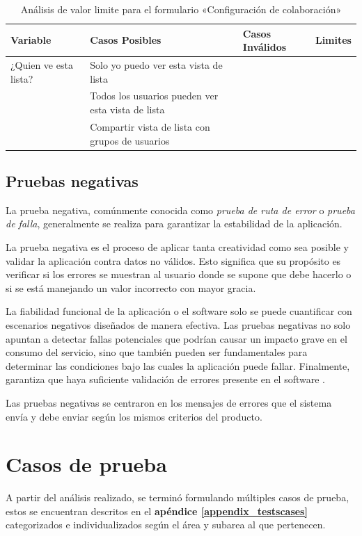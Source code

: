 \begin{table}[H]
\centering
\begin{tabular}{|l|l|l|l|}
\hline
\footnotesize{\textbf{Variable}} & \footnotesize{\textbf{Casos Posibles}} & \footnotesize{\textbf{Casos Inválidos}} & \footnotesize{\textbf{Limites}} \\
\hline
\footnotesize{¿Quien ve esta lista?} & \footnotesize{Solo yo puedo ver esta vista de lista} & & \\
& \footnotesize{Todos los usuarios pueden ver esta vista de lista} & & \\
& \footnotesize{Compartir vista de lista con grupos de usuarios} & & \\
\hline
\end{tabular}
\caption{Análisis de valor limite para el formulario «Configuración de colaboración»}
\label{myers_09}
\end{table}

\subsection{Pruebas negativas}
La prueba negativa, comúnmente conocida como \emph{prueba de ruta de error} o
\emph{prueba de falla}, generalmente se realiza para garantizar la estabilidad
de la aplicación.

La prueba negativa es el proceso de aplicar tanta creatividad como sea posible y
validar la aplicación contra datos no válidos. Esto significa que su propósito
es verificar si los errores se muestran al usuario donde se supone que debe
hacerlo o si se está manejando un valor incorrecto con mayor gracia.

La fiabilidad funcional de la aplicación o el software solo se puede cuantificar
con escenarios negativos diseñados de manera efectiva. Las pruebas negativas no
solo apuntan a detectar fallas potenciales que podrían causar un impacto grave
en el consumo del servicio, sino que también pueden ser fundamentales para
determinar las condiciones bajo las cuales la aplicación puede fallar.
Finalmente, garantiza que haya suficiente validación de errores presente en el
software \cite{Nadig}.

Las pruebas negativas se centraron en los mensajes de errores que el sistema
envía y debe enviar según los mismos criterios del producto.

\section{Casos de prueba}
A partir del análisis realizado, se terminó formulando múltiples casos de
prueba, estos se encuentran descritos en el \textbf{apéndice
\ref{appendix_testscases}} categorizados e individualizados según el área y
subarea al que pertenecen.

